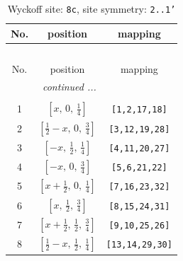 \documentclass[fleqn,8pt]{jsarticle}
\begin{document}
\begin{longtable}{ccc}
\caption{Wyckoff site: {\tt 8c}, site symmetry: {\tt 2..1'}}
 \\
 \hline \hline
No. & position & mapping \\ \hline \endfirsthead

\multicolumn{2}{l}{\tablename\ \thetable{}} \\
 \hline \hline
No. & position & mapping \\ \hline \endhead

 \hline \hline
\multicolumn{2}{r}{\footnotesize\it continued ...} \\ \endfoot

 \hline \hline
\multicolumn{2}{r}{} \\ \endlastfoot

1 & $\left[ x,\, 0,\, \frac{1}{4} \right]$ & {\tt [1,2,17,18]} \\ \hline
2 & $\left[ \frac{1}{2} - x,\, 0,\, \frac{3}{4} \right]$ & {\tt [3,12,19,28]} \\ \hline
3 & $\left[ - x,\, \frac{1}{2},\, \frac{1}{4} \right]$ & {\tt [4,11,20,27]} \\ \hline
4 & $\left[ - x,\, 0,\, \frac{3}{4} \right]$ & {\tt [5,6,21,22]} \\ \hline
5 & $\left[ x + \frac{1}{2},\, 0,\, \frac{1}{4} \right]$ & {\tt [7,16,23,32]} \\ \hline
6 & $\left[ x,\, \frac{1}{2},\, \frac{3}{4} \right]$ & {\tt [8,15,24,31]} \\ \hline
7 & $\left[ x + \frac{1}{2},\, \frac{1}{2},\, \frac{3}{4} \right]$ & {\tt [9,10,25,26]} \\ \hline
8 & $\left[ \frac{1}{2} - x,\, \frac{1}{2},\, \frac{1}{4} \right]$ & {\tt [13,14,29,30]} \\
\end{longtable}
\renewcommand{\arraystretch}{1.2}
\end{document}
